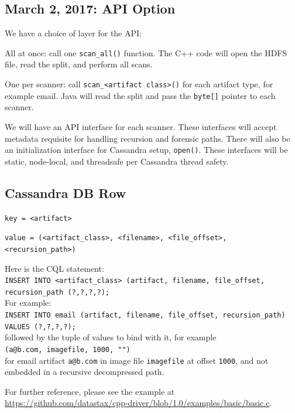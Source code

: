 \documentclass[12pt,twoside]{article}
\begin{document}
\subsection{March 2, 2017: API Option}
We have a choice of layer for the API:
\begin{compactitem}
\item All at once: call one \verb+scan_all()+ function.  The C++ code will open the HDFS file, read the split, and perform all scans.
\item One per scanner: call \verb+scan_<artifact class>()+ for each artifact type, for example email. Java will read the split and pass the \verb+byte[]+ pointer to each scanner.
\end{compactitem}
We will have an API interface for each scanner. These interfaces will accept metadata requisite for handling recursion and forensic paths.
There will also be an initialization interface for Cassandra setup, \verb+open()+. These interfaces will be static, node-local, and threadsafe per Cassandra thread safety.

\subsection{Cassandra DB Row}
\begin{compactitem}
\item \verb+key = <artifact>+
\item \verb+value = (<artifact_class>, <filename>, <file_offset>,+\\
\verb+<recursion_path>)+
\end{compactitem}
Here is the CQL statement:\\
\verb+INSERT INTO <artifact_class> (artifact, filename, file_offset,+\\
\verb+recursion_path (?,?,?,?);+\\
For example:\\
\verb+INSERT INTO email (artifact, filename, file_offset, recursion_path)+\\
\verb+VALUES (?,?,?,?);+\\
followed by the tuple of values to bind with it, for example\\
\verb+(a@b.com, imagefile, 1000, "")+\\
for email artifact \verb+a@b.com+ in image file \verb+imagefile+ at offset \verb+1000+, and not embedded in a recursive decompressed path.

For further reference, please see the example at \url{https://github.com/datastax/cpp-driver/blob/1.0/examples/basic/basic.c}.
\end{document}

